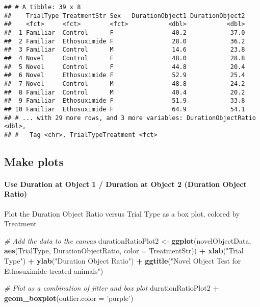 \documentclass[]{article}
\newenvironment{Shaded}{\begin{snugshade}}{\end{snugshade}}
\newcommand{\KeywordTok}[1]{\textcolor[rgb]{0.13,0.29,0.53}{\textbf{#1}}}
\newcommand{\DataTypeTok}[1]{\textcolor[rgb]{0.13,0.29,0.53}{#1}}
\newcommand{\StringTok}[1]{\textcolor[rgb]{0.31,0.60,0.02}{#1}}
\newcommand{\CommentTok}[1]{\textcolor[rgb]{0.56,0.35,0.01}{\textit{#1}}}
\newcommand{\OperatorTok}[1]{\textcolor[rgb]{0.81,0.36,0.00}{\textbf{#1}}}
\newcommand{\NormalTok}[1]{#1}
\let\oldparagraph\paragraph
\renewcommand{\paragraph}[1]{\oldparagraph{#1}\mbox{}}
\begin{document}
\begin{verbatim}
## # A tibble: 39 x 8
##    TrialType TreatmentStr Sex   DurationObject1 DurationObject2
##    <fct>     <fct>        <fct>           <dbl>           <dbl>
##  1 Familiar  Control      F                40.2            37.0
##  2 Familiar  Ethosuximide F                28.0            36.2
##  3 Familiar  Control      M                14.6            23.8
##  4 Novel     Control      F                48.0            28.8
##  5 Novel     Control      F                44.8            20.4
##  6 Novel     Ethosuximide F                52.9            25.4
##  7 Novel     Control      M                48.8            24.2
##  8 Familiar  Control      M                40.4            20.2
##  9 Familiar  Ethosuximide F                51.9            33.8
## 10 Familiar  Ethosuximide F                64.9            54.1
## # ... with 29 more rows, and 3 more variables: DurationObjectRatio <dbl>,
## #   Tag <chr>, TrialTypeTreatment <fct>
\end{verbatim}

\subsection{Make plots}\label{make-plots}

\paragraph{Use Duration at Object 1 / Duration at Object 2 (Duration
Object
Ratio)}\label{use-duration-at-object-1-duration-at-object-2-duration-object-ratio}

Plot the Duration Object Ratio versus Trial Type as a box plot, colored
by Treatment

\begin{Shaded}
\begin{Highlighting}[]
\CommentTok{# Add the data to the canvas}
\NormalTok{durationRatioPlot2 <-}\StringTok{ }
\StringTok{    }\KeywordTok{ggplot}\NormalTok{(novelObjectData, }\KeywordTok{aes}\NormalTok{(TrialType, DurationObjectRatio, }\DataTypeTok{color =}\NormalTok{ TreatmentStr)) }\OperatorTok{+}
\StringTok{    }\KeywordTok{xlab}\NormalTok{(}\StringTok{"Trial Type"}\NormalTok{) }\OperatorTok{+}\StringTok{ }\KeywordTok{ylab}\NormalTok{(}\StringTok{"Duration Object Ratio"}\NormalTok{) }\OperatorTok{+}
\StringTok{    }\KeywordTok{ggtitle}\NormalTok{(}\StringTok{"Novel Object Test for Ethosuximide-treated animals"}\NormalTok{)}

\CommentTok{# Plot as a combination of jitter and box plot}
\NormalTok{durationRatioPlot2 }\OperatorTok{+}\StringTok{ }\KeywordTok{geom_boxplot}\NormalTok{(}\DataTypeTok{outlier.color =} \StringTok{'purple'}\NormalTok{)}
\end{Highlighting}
\end{Shaded}
\end{document}
